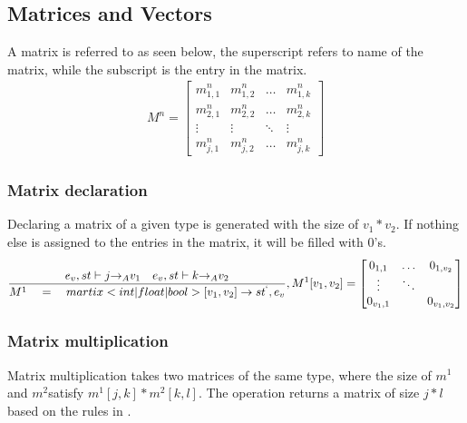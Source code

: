 \subsection*{Matrices and Vectors}
A matrix is referred to as seen below, the superscript refers to name of the matrix, while the subscript is the entry in the matrix.
\begin{align*}
	M^{n}= \begin{bmatrix} { { m }_{ 1,1 }^{ n } } & { { m }_{ 1,2 }^{ n } } & \dots  & { m }_{ 1,k }^{ n } \\
{ { m }_{ 2,1 }^{ n } }  &  { { m }_{ 2,2 }^{ n } } & \dots & { m }_{ 2,k }^{ n }
\\ \vdots  & \vdots & \ddots  & \vdots \\
 { m }_{ j,1 }^{ n } & { m }_{ j,2 }^{ n } & \dots & { m }_{ j,k }^{ n } \end{bmatrix}
\end{align*}

\subsubsection{Matrix declaration}
Declaring a matrix of a given type is generated with the size of $v_{1}*v_{2}$. 
If nothing else is assigned to the entries in the matrix, it will be filled with $0$'s.
\begin{equation}
	\frac { { e }_{ v },st\vdash j{ \rightarrow  }_{ A }{ v }_{ 1 }\quad { e }_{ v },st\vdash k{ \rightarrow  }_{ A }{ v }_{ 2 } }{ { M }^{ 1 }\quad =\quad martix<int|float|bool>[{ v }_{ 1 },{ v }_{ 2 }]\rightarrow { st }^{ ` },{ e }_{ v } } ,{ M }^{ 1 }[{ v }_{ 1 },{ v }_{ 2 }]=\begin{bmatrix} { { 0 }_{ 1,1 } } & \dots  & { 0 }_{ { 1,{ v }_{ 2 } } } \\ \vdots  & \ddots  &  \\ { 0 }_{ { v }_{ 1 },1 } &  & { 0 }_{ { v }_{ 1 },{ v }_{ 2 } } \end{bmatrix}
\end{equation}

\subsubsection{Matrix multiplication}
Matrix multiplication takes two matrices of the same type, where the size of $m^{1}$ and $m^{2}$satisfy $m^{1}[j,k]*m^{2}[k,l]$.
The operation returns a matrix of size $j*l$ based on the rules in .

